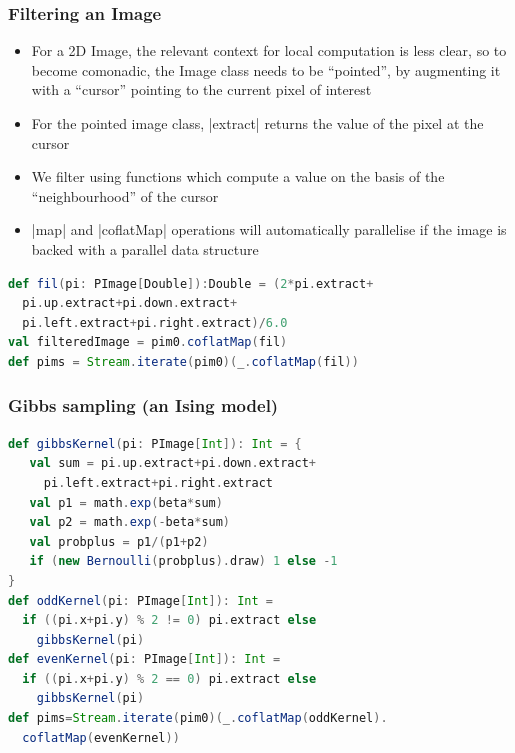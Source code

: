 \documentclass[mathserif,handout]{beamer}
\begin{document}
\begin{frame}[fragile]
\frametitle{Filtering an Image}
\begin{itemize}
\item For a 2D Image, the relevant context for local computation is less clear, so to become comonadic, the Image class needs to be ``pointed'', by augmenting it with a ``cursor'' pointing to the current pixel of interest
\item For the pointed image class, |extract| returns the value of the pixel at the cursor
\item We filter using functions which compute a value on the basis of the ``neighbourhood'' of the cursor
\item |map| and |coflatMap| operations will automatically parallelise if the image is backed with a parallel data structure
\end{itemize}
\begin{lstlisting}[language=scala]
def fil(pi: PImage[Double]):Double = (2*pi.extract+
  pi.up.extract+pi.down.extract+
  pi.left.extract+pi.right.extract)/6.0
val filteredImage = pim0.coflatMap(fil)  
def pims = Stream.iterate(pim0)(_.coflatMap(fil))
\end{lstlisting}
\end{frame}

\begin{frame}[fragile]
\frametitle{Gibbs sampling (an Ising model)}
\begin{lstlisting}[language=scala]
def gibbsKernel(pi: PImage[Int]): Int = {
   val sum = pi.up.extract+pi.down.extract+
     pi.left.extract+pi.right.extract
   val p1 = math.exp(beta*sum)
   val p2 = math.exp(-beta*sum)
   val probplus = p1/(p1+p2)
   if (new Bernoulli(probplus).draw) 1 else -1
}
def oddKernel(pi: PImage[Int]): Int =
  if ((pi.x+pi.y) % 2 != 0) pi.extract else
    gibbsKernel(pi)
def evenKernel(pi: PImage[Int]): Int =
  if ((pi.x+pi.y) % 2 == 0) pi.extract else
    gibbsKernel(pi)
def pims=Stream.iterate(pim0)(_.coflatMap(oddKernel).
  coflatMap(evenKernel))
\end{lstlisting}
\end{frame}
\end{document}
